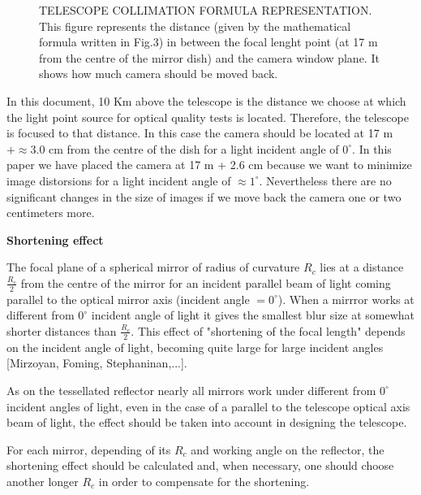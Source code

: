 {%
   \begin{figure}[h]\centering
   \leavevmode
   \epsfxsize=6cm
   \caption{\tiny{TELESCOPE COLLIMATION FORMULA REPRESENTATION. This figure represents the distance (given by the mathematical formula written in Fig.3) in between the focal lenght point (at 17 m from the centre of the mirror dish) and the camera window plane. It shows how much camera should be moved back.}}
   \end{figure}


In this document, 10 Km above the telescope is the distance we choose at which the light point source for optical quality tests is located.
 Therefore, the telescope is focused to that distance. In this case the camera should be located at 17 m $+ \approx$3.0 cm from the centre of the dish for a light incident angle of $0^{\circ}$. In this paper we have placed the camera at 17 m + 2.6 cm because we want to minimize image distorsions for a light incident angle of $\approx 1^{\circ}$. Nevertheless there are no significant changes in the size of images if we move back the camera one or two centimeters more.

\vspace{0.5cm}

{\bf Shortening effect}

The focal plane of a spherical mirror of radius of curvature $R_c$ lies at a distance $\frac{R_c}{2}$ from the centre of the mirror for an incident parallel beam of light coming parallel to the optical mirror axis (incident angle $= 0^{\circ}$). When a mirrror works at different from $0^{\circ}$ incident angle of light it gives the smallest blur size at somewhat shorter distances than $\frac{R_c}{2}$. This effect of "shortening of the focal length" depends on the incident angle of light, becoming quite large for large incident angles [Mirzoyan, Foming, Stephaninan,...].

As on the tessellated reflector nearly all mirrors work under different from $0^{\circ}$ incident angles of light, even in the case of a parallel to the telescope optical axis beam of light, the effect should be taken into account in designing the telescope.

For each mirror, depending of its $R_c$ and working angle on the reflector, the shortening effect should be calculated and, when necessary, one should choose another longer $R_c$ in order to compensate for the shortening.

}
